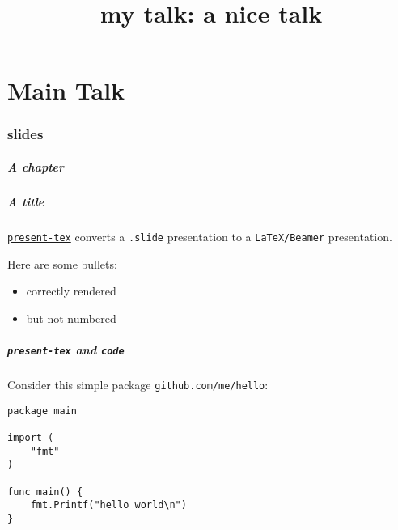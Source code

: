 \documentclass[9pt]{beamer}
\title[my talk: a nice talk]{my talk: a nice talk}
\newcommand{\myblue} [1] {{\color{blue}#1}}
\begin{document}
\frame{\titlepage
}

\part<presentation>{Main Talk}

\section[slides]{slides}


\begin{frame}[fragile]
\frametitle{A chapter}


\end{frame}

\begin{frame}[fragile]
\frametitle{A title}



\myblue{\href{https://github.com/sbinet/present-tex}{\texttt{present-tex}}} converts a \texttt{.slide}
presentation to a \texttt{LaTeX/Beamer} presentation.




Here are some bullets:



\begin{itemize}
\item correctly rendered
\item but not numbered

\end{itemize}


\end{frame}

\begin{frame}[fragile]
\frametitle{\texttt{present-tex} and \texttt{code}}



Consider this simple package \texttt{github.com/me/hello}:



\begin{verbatim}
package main

import (
	"fmt"
)

func main() {
	fmt.Printf("hello world\n")
}

\end{verbatim}


\end{frame}
\end{document}
